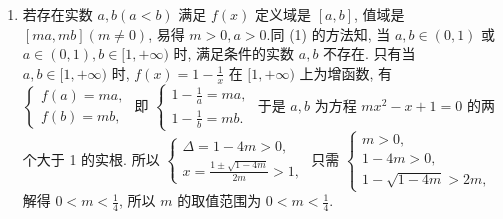 \begin{enumerate}
\begin{jieda}
\begin{enumerate}
\item 若存在实数 $a, b(a<b)$ 满足 $f(x)$ 定义域是 $[a, b]$, 值域是 $[m a, m b](m \neq 0)$, 易得 $m>0, a>0$.同 (1) 的方法知, 当 $a, b \in(0,1)$ 或 $a \in(0,1), b \in[1,+\infty)$ 时, 满足条件的实数 $a, b$ 不存在.
只有当 $a, b \in[1,+\infty)$ 时, $f(x)=1-\frac{1}{x}$ 在 $[1,+\infty)$ 上为增函数, 有 $\left\{\begin{array}{l}f(a)=m a, \\ f(b)=m b,\end{array}\right.$
即 $\left\{\begin{array}{l}1-\frac{1}{a}=m a, \\ 1-\frac{1}{b}=m b .\end{array}\right.$ 于是 $a, b$ 为方程 $m x^2-x+1=0$ 的两个大于 1 的实根.
所以 $\left\{\begin{array}{l}\Delta=1-4 m>0, \\ x=\frac{1 \pm \sqrt{1-4 m}}{2 m}>1,\end{array}\right.$ 只需 $\left\{\begin{array}{l}m>0, \\ 1-4 m>0, \\ 1-\sqrt{1-4 m}>2 m,\end{array}\right.$ 解得 $0<m<\frac{1}{4}$,
所以 $m$ 的取值范围为 $0<m<\frac{1}{4}$.
\end{enumerate}
\end{jieda}


\end{enumerate}
